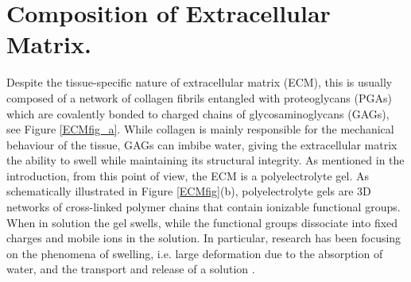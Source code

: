 \documentclass[runningheads]{llncs}
\begin{document}
\section{Composition of Extracellular Matrix.}
\label{ECMcomp}
Despite the tissue-specific nature of extracellular matrix (ECM), this is usually composed of a network of collagen fibrils entangled with proteoglycans (PGAs) which are covalently bonded to charged chains of glycosaminoglycans (GAGs), see Figure \ref{ECMfig_a}.  While collagen is mainly responsible for the mechanical behaviour of the tissue, GAGs can imbibe water, giving the extracellular matrix the ability to swell while maintaining its structural integrity. As mentioned in the introduction, from this point of view, the ECM is a polyelectrolyte gel. As schematically illustrated in Figure \ref{ECMfig}(b), polyelectrolyte gels are 3D networks of cross-linked polymer chains that contain ionizable functional groups. When in solution the gel swells, while the functional groups dissociate into fixed charges and mobile ions in the solution. In particular, research has been focusing on the phenomena of swelling, i.e. large deformation due to the absorption of water, and the transport and release of a solution  \cite{DROZDOV+,DROZDOVph,Reviewpolyel,swell2}.
\end{document}

